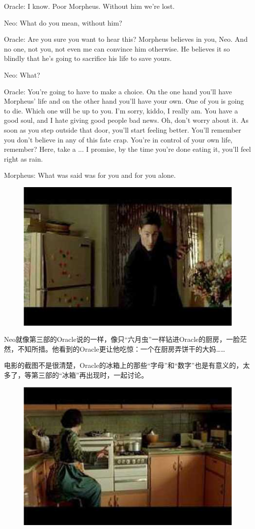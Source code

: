 \documentclass{ctexart}
\newenvironment{myquote}{\color{green} \setlength{\leftskip}{6em} \setlength{\rightskip}{4em} \setlength{\parindent}{-2em}}{\par}
\begin{document}
\begin{myquote}
Oracle: I know. Poor Morpheus. Without him we're lost.

Neo: What do you mean, without him?

Oracle: Are you sure you want to hear this? Morpheus believes in you, Neo. And no one, not you, not even me can convince him otherwise. He believes it so blindly that he's going to sacrifice his life to save yours.

Neo: What?

Oracle: You're going to have to make a choice. On the one hand you'll have Morpheus' life and on the other hand you'll have your own. One of you is going to die. Which one will be up to you. I'm sorry, kiddo, I really am. You have a good soul, and I hate giving good people bad news. Oh, don't worry about it. As soon as you step outside that door, you'll start feeling better. You'll remember you don't believe in any of this fate crap. You're in control of your own life, remember? Here, take a ... I promise, by the time you're done eating it, you'll feel right as rain.

Morpheus: What was said was for you and for you alone.
\end{myquote}

\begin{figure}[htb]
\centering
\includegraphics[width=0.5\linewidth]{fig/read_Matrix-46}
\end{figure}

Neo就像第三部的Oracle说的一样，像只“六月虫”一样钻进Oracle的厨房，一脸茫然，不知所措。他看到的Oracle更让他吃惊：一个在厨房弄饼干的大妈……

电影的截图不是很清楚，Oracle的冰箱上的那些“字母”和“数字”也是有意义的，太多了，等第三部的“冰箱”再出现时，一起讨论。

\begin{figure}[htb]
\centering
\includegraphics[width=0.5\linewidth]{fig/read_Matrix-47}
\end{figure}
\end{document}
